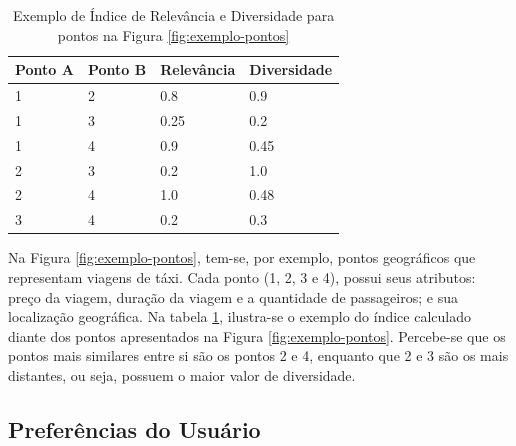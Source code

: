 \begin{table}[]
	\caption{Exemplo de Índice de Relevância e Diversidade para pontos na Figura \ref{fig:exemplo-pontos}}
	\label{table:exemplo-indice}
	\centering
	\begin{tabular}{llll}
	\hline
	\textbf{Ponto A} & \textbf{Ponto B} & \textbf{Relevância} & \textbf{Diversidade} \\ \hline
	1                                      & 2                                     & 0.8                                      & 0.9                                       \\ 
	1                                      & 3                                     & 0.25                                     & 0.2                                       \\ 
	1                                      & 4                                     & 0.9                                      & 0.45                                      \\ 
	2                                      & 3                                     & 0.2                                      & 1.0                                       \\ 
	2                                      & 4                                     & 1.0                                      & 0.48                                      \\ 
	3                                      & 4                                     & 0.2                                      & 0.3                                       \\ \hline
	\end{tabular}
	\mfonte
\end{table}

Na Figura \ref{fig:exemplo-pontos}, tem-se, por exemplo, pontos geográficos que representam viagens de táxi. Cada ponto (1, 2, 3 e 4), possui seus atributos: preço da viagem, duração da viagem e a quantidade de passageiros; e sua localização geográfica. Na tabela \ref{table:exemplo-indice}, ilustra-se o exemplo do índice calculado diante dos pontos apresentados na Figura \ref{fig:exemplo-pontos}. Percebe-se que os pontos mais similares entre si são os pontos 2 e 4, enquanto que 2 e 3 são os mais distantes, ou seja, possuem o maior valor de diversidade.


\subsection{Preferências do Usuário}

